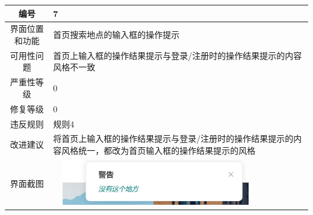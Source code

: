 \documentclass[a4paper,12pt]{article}
\begin{document}
\begin{tabular}{|c|p{10cm}|}
	\hline
	编号 & 7 \\
	\hline
	界面位置和功能 & 首页搜索地点的输入框的操作提示 \\
	\hline
	可用性问题 & 首页上输入框的操作结果提示与登录/注册时的操作结果提示的内容风格不一致\\
	\hline
	严重性等级 & 0 \\
	\hline
	修复等级 & 0 \\
	\hline
	违反规则 & 规则4 \\
	\hline
	改进建议 & 将首页上输入框的操作结果提示与登录/注册时的操作结果提示的内容风格统一，都改为首页输入框的操作结果提示的风格 \\
	\hline
	界面截图 & \includegraphics[width=9cm, height=2cm]{q7.jpg} \\
	\hline
\end{tabular}
\end{document}

